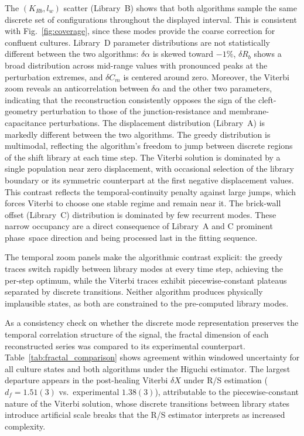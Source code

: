 \documentclass[english, 10pt, a4paper]{article}
\newcommand{\dX}{\ensuremath{\delta X}}
\begin{document}
The $(K_{Rb}, l_w)$ scatter (Library~B) shows that both algorithms sample the same discrete set of configurations throughout the displayed interval. This is consistent with Fig.~\ref{fig:coverage}, since these modes provide the coarse correction for confluent cultures. Library~D parameter distributions are not statistically different between the two algorithms: $\delta\alpha$ is skewed toward $-1\%$, $\delta R_b$ shows a broad distribution across mid-range values with pronounced peaks at the perturbation extremes, and $\delta C_m$ is centered around zero. Moreover, the Viterbi zoom reveals an anticorrelation between $\delta\alpha$ and the other two parameters, indicating that the reconstruction consistently opposes the sign of the cleft-geometry perturbation to those of the junction-resistance and membrane-capacitance perturbations. The displacement distribution (Library~A) is markedly different between the two algorithms. The greedy distribution is multimodal, reflecting the algorithm's freedom to jump between discrete regions of the shift library at each time step. The Viterbi solution is dominated by a single population near zero displacement, with occasional selection of the library boundary or its symmetric counterpart at the first negative displacement values. This contrast reflects the temporal-continuity penalty against large jumps, which forces Viterbi to choose one stable regime and remain near it. The brick-wall offset (Library~C) distribution is dominated by few recurrent modes. These narrow occupancy are a direct consequence of Library~A and C prominent phase~space direction and being processed last in the fitting sequence.

The temporal zoom panels make the algorithmic contrast explicit: the greedy traces switch rapidly between library modes at every time step, achieving the per-step optimum, while the Viterbi traces exhibit piecewise-constant plateaus separated by discrete transitions. Neither algorithm produces physically implausible states, as both are constrained to the pre-computed library modes.


As a consistency check on whether the discrete mode representation preserves the temporal correlation structure of the signal, the fractal dimension of each reconstructed series was compared to its experimental counterpart. Table~\ref{tab:fractal_comparison} shows agreement within windowed uncertainty for all culture states and both algorithms under the Higuchi estimator. The largest departure appears in the post-healing Viterbi $\dX$ under R/S estimation ($d_f = 1.51(3)$ vs.\ experimental $1.38(3)$), attributable to the piecewise-constant nature of the Viterbi solution, whose discrete transitions between library states introduce artificial scale breaks that the R/S estimator interprets as increased complexity.
\end{document}
